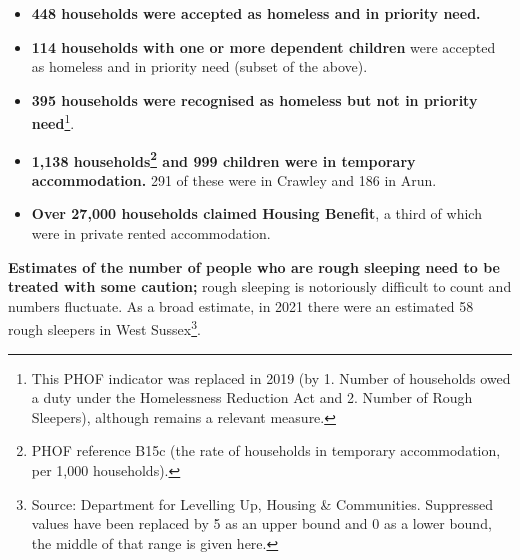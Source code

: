 \begin{itemize}
\item {\bfseries 448 households were accepted as homeless and in priority need.}
\item {\bfseries 114 households with one or more dependent children} were accepted as homeless and in priority need (subset of the above).
\item {\bfseries 395 households were recognised as homeless but not in priority need}\footnote{This PHOF indicator was replaced in 2019 (by 1. Number of households owed a duty under the Homelessness Reduction Act and 2. Number of Rough Sleepers), although remains a relevant measure.}.
\item {\bfseries 1,138 households\footnote{PHOF reference B15c (the rate of households in temporary accommodation, per 1,000 households).} and 999 children were in temporary accommodation.} 291 of these were in Crawley and 186 in Arun.
\item {\bfseries Over 27,000 households claimed Housing Benefit}, a third of which were in private rented accommodation.
\end{itemize}
{\bfseries Estimates of the number of people who are rough sleeping need to be treated with some caution;} rough sleeping is notoriously difficult to count and numbers fluctuate. As a broad estimate, in 2021 there were an estimated 58 rough sleepers in West Sussex\footnote{Source: Department for Levelling Up, Housing \& Communities. Suppressed values have been replaced by 5 as an upper bound and 0 as a lower bound, the middle of that range is given here.}.



